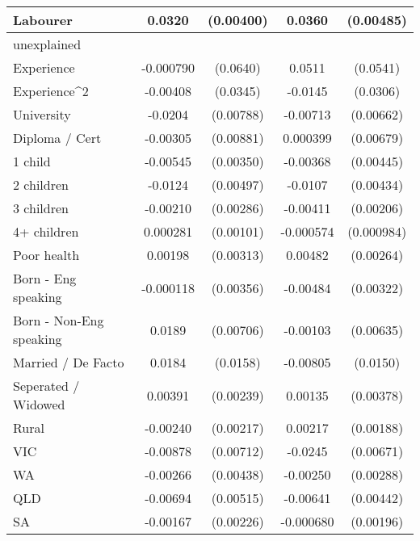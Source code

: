 {\begin{tabular}{l*{2}{cc}}
Labourer            &      0.0320\sym{***}&   (0.00400)&      0.0360\sym{***}&   (0.00485)\\
\hline
unexplained         &                     &            &                     &            \\
Experience          &   -0.000790         &    (0.0640)&      0.0511         &    (0.0541)\\
Experience^{2}      &    -0.00408         &    (0.0345)&     -0.0145         &    (0.0306)\\
University          &     -0.0204\sym{***}&   (0.00788)&    -0.00713         &   (0.00662)\\
Diploma / Cert      &    -0.00305         &   (0.00881)&    0.000399         &   (0.00679)\\
1 child             &    -0.00545         &   (0.00350)&    -0.00368         &   (0.00445)\\
2 children          &     -0.0124\sym{**} &   (0.00497)&     -0.0107\sym{**} &   (0.00434)\\
3 children          &    -0.00210         &   (0.00286)&    -0.00411\sym{**} &   (0.00206)\\
4+ children         &    0.000281         &   (0.00101)&   -0.000574         &  (0.000984)\\
Poor health         &     0.00198         &   (0.00313)&     0.00482\sym{*}  &   (0.00264)\\
Born - Eng speaking &   -0.000118         &   (0.00356)&    -0.00484         &   (0.00322)\\
Born - Non-Eng speaking&      0.0189\sym{***}&   (0.00706)&    -0.00103         &   (0.00635)\\
Married / De Facto  &      0.0184         &    (0.0158)&    -0.00805         &    (0.0150)\\
Seperated / Widowed &     0.00391         &   (0.00239)&     0.00135         &   (0.00378)\\
Rural               &    -0.00240         &   (0.00217)&     0.00217         &   (0.00188)\\
VIC                 &    -0.00878         &   (0.00712)&     -0.0245\sym{***}&   (0.00671)\\
WA                  &    -0.00266         &   (0.00438)&    -0.00250         &   (0.00288)\\
QLD                 &    -0.00694         &   (0.00515)&    -0.00641         &   (0.00442)\\
SA                  &    -0.00167         &   (0.00226)&   -0.000680         &   (0.00196)\\

\end{tabular}}
